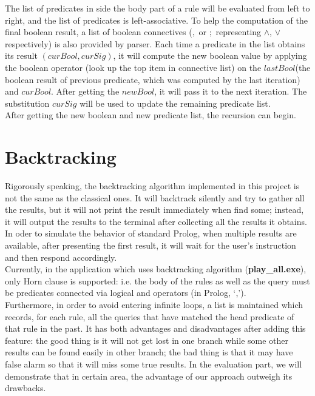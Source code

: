 \documentclass[11pt,a4paper]{report}
\begin{document}
The list of predicates in side the body part of a rule will be evaluated from left to right, and the list of predicates is left-associative. To help the computation of the final boolean result, a list of boolean connectives ($,$ or $;$ representing $\land$, $\lor$ respectively) is also provided by parser. Each time a predicate in the list obtains its result $(curBool,curSig)$, it will compute the new boolean value by applying the boolean operator (look up the top item in connective list) on the $lastBool$(the boolean result of previous predicate, which was computed by the last iteration) and $curBool$. After getting the $newBool$, it will pass it to the next iteration. The substitution $curSig$ will be used to update the remaining predicate list. \\

After getting the new boolean and new predicate list, the recursion can begin.

\section*{Backtracking}
Rigorously speaking, the backtracking algorithm implemented in this project is not the same as the classical ones. It will backtrack silently and try to
gather all the results, but it will not print the result immediately when find some; instead, it will output the results to the terminal after collecting all the results it obtains. In oder to simulate the behavior of standard Prolog, when multiple results are available, after presenting the first result, it will wait for the user's instruction and then respond accordingly.\\

Currently, in the application which uses backtracking algorithm (\textbf{play\_all.exe}), only Horn clause is supported: i.e. the body of the rules as well as the query must be predicates connected via logical and operators (in Prolog, `,').\\ Furthermore, in order to avoid entering infinite loops, a list is maintained which records, for each rule, all the queries that have matched the head predicate of that rule in the past. It has both advantages and disadvantages after adding this feature: the good thing is it will not get lost in one branch while some other results can be found easily in other branch; the bad thing is that it may have false alarm so that it will miss some true results. In the evaluation part, we will demonstrate that in certain area, the advantage of our approach outweigh its drawbacks.\\
\end{document}
